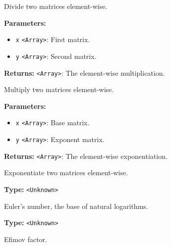 \documentclass[12pt,a4paper]{article}
\begin{document}
\noindent Divide two matrices element-wise.

\vspace{5mm}
\noindent {}


\noindent \textbf{Parameters:}
\begin{itemize}
  \item \texttt{x} \texttt{<Array>}: First matrix.
  \item \texttt{y} \texttt{<Array>}: Second matrix.
\end{itemize}

\noindent \textbf{Returns:} \texttt{<Array>}: The element-wise multiplication.

\noindent Multiply two matrices element-wise.

\vspace{5mm}
\noindent {}


\noindent \textbf{Parameters:}
\begin{itemize}
  \item \texttt{x} \texttt{<Array>}: Base matrix.
  \item \texttt{y} \texttt{<Array>}: Exponent matrix.
\end{itemize}

\noindent \textbf{Returns:} \texttt{<Array>}: The element-wise exponentiation.

\noindent Exponentiate two matrices element-wise.

\vspace{5mm}
\noindent {}\vspace{4mm}


\noindent \textbf{Type:} \texttt{<Unknown>}

\noindent Euler's number, the base of natural logarithms.

\vspace{5mm}
\noindent {}\vspace{4mm}


\noindent \textbf{Type:} \texttt{<Unknown>}

\noindent Efimov factor.
\end{document}
